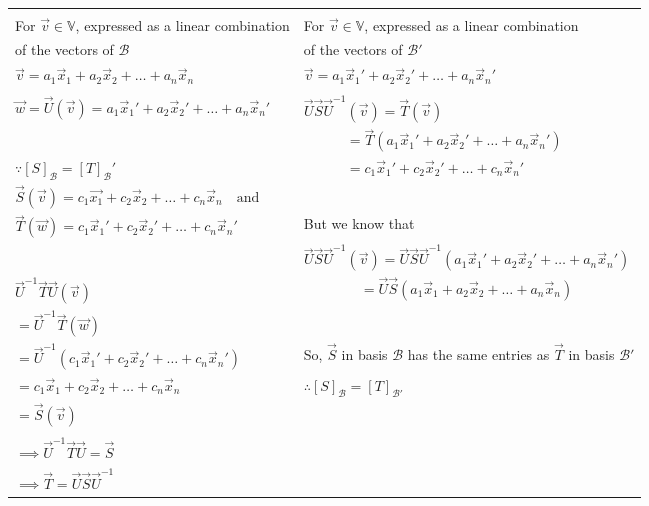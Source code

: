 \begin{table*}[h!]
\begin{center}
\begin{tabular}{|l|l|}
 & \\
For $\vec{v} \in \mathbb V$, expressed as a linear combination &
For $\vec{v} \in \mathbb V$, expressed as a linear combination\\
of the vectors of $\mathcal{B}$ &
of the vectors of $\mathcal{B'}$\\
$\vec{v} = a_1\vec{x}_1 + a_2\vec{x}_2 + \ldots + a_n\vec{x}_n$ &
$\vec{v} = a_1\vec{x}_1' + a_2\vec{x}_2' + \ldots + a_n\vec{x}_n'$\\
 & \\
$\vec{w} = \vec{U}(\vec{v}) = a_1\vec{x}_1' + a_2\vec{x}_2' + \ldots + a_n\vec{x}_n'$ &
$\vec{U}\vec{S}\vec{U}^{-1}(\vec{v}) = \vec{T}(\vec{v})$\\
 & $\quad\quad\quad= \vec{T}(a_1\vec{x}_1' + a_2\vec{x}_2' + \ldots + a_n\vec{x}_n')$\\
$\because [S]_\mathcal{B} = [T]_\mathcal{B}'$ &
$\quad\quad\quad= c_1\vec{x}_1' + c_2\vec{x}_2' + \ldots + c_n\vec{x}_n'$\\
$\vec{S}(\vec{v}) = c_1\vec{x_1} + c_2\vec{x}_2 + \ldots + c_n\vec{x}_n\quad\text{and}$ & \\
$\vec{T}(\vec{w}) = c_1\vec{x}_1' + c_2\vec{x}_2' + \ldots + c_n\vec{x}_n'$ &
But we know that\\
 & $\vec{U}\vec{S}\vec{U}^{-1}(\vec{v}) = \vec{U}\vec{S}\vec{U}^{-1}(a_1\vec{x}_1' + a_2\vec{x}_2' + \ldots + a_n\vec{x}_n')$\\
$\vec{U}^{-1}\vec{T}\vec{U}(\vec{v})$ &
$\quad\quad\quad\quad= \vec{U}\vec{S}(a_1\vec{x}_1+a_2\vec{x}_2+\ldots+a_n\vec{x}_n)$\\
$=\vec{U}^{-1}\vec{T}(\vec{w})$ & \\
$=\vec{U}^{-1}(c_1\vec{x}_1' + c_2\vec{x}_2' + \ldots + c_n\vec{x}_n')$ &
So, $\vec{S}$ in basis $\mathcal{B}$ has the same entries as $\vec{T}$ in basis $\mathcal{B}'$\\
$= c_1\vec{x}_1 + c_2\vec{x}_2 + \ldots + c_n\vec{x}_n$ &
$\therefore [S]_\mathcal{B} = [T]_\mathcal{B'}$\\
$=\vec{S}(\vec{v})$ & \\
 & \\
$\implies\vec{U}^{-1}\vec{T}\vec{U} = \vec{S}$ & \\
$\implies \vec{T} = \vec{U}\vec{S}\vec{U}^{-1}$ & \\[0.5ex] \hline
\end{tabular}
\caption{}
\label{eq:solutions/3/4/9/table:1}
\end{center}
\end{table*}
